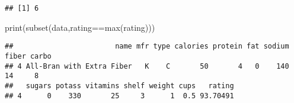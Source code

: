 \documentclass[
]{article}
\newenvironment{Shaded}{\begin{snugshade}}{\end{snugshade}}
\newcommand{\CommentTok}[1]{\textcolor[rgb]{0.56,0.35,0.01}{\textit{#1}}}
\newcommand{\FunctionTok}[1]{\textcolor[rgb]{0.00,0.00,0.00}{#1}}
\newcommand{\NormalTok}[1]{#1}
\newcommand{\OtherTok}[1]{\textcolor[rgb]{0.56,0.35,0.01}{#1}}
\newcommand{\SpecialCharTok}[1]{\textcolor[rgb]{0.00,0.00,0.00}{#1}}
\begin{document}
\begin{Shaded}
\end{Shaded}

\begin{verbatim}
## [1] 6
\end{verbatim}

\begin{Shaded}
\begin{Highlighting}[]
\FunctionTok{print}\NormalTok{(}\FunctionTok{subset}\NormalTok{(data,rating}\SpecialCharTok{==}\FunctionTok{max}\NormalTok{(rating)))}
\end{Highlighting}
\end{Shaded}

\begin{verbatim}
##                        name mfr type calories protein fat sodium fiber carbo
## 4 All-Bran with Extra Fiber   K    C       50       4   0    140    14     8
##   sugars potass vitamins shelf weight cups   rating
## 4      0    330       25     3      1  0.5 93.70491
\end{verbatim}

\begin{Shaded}
\end{Shaded}
\end{document}

